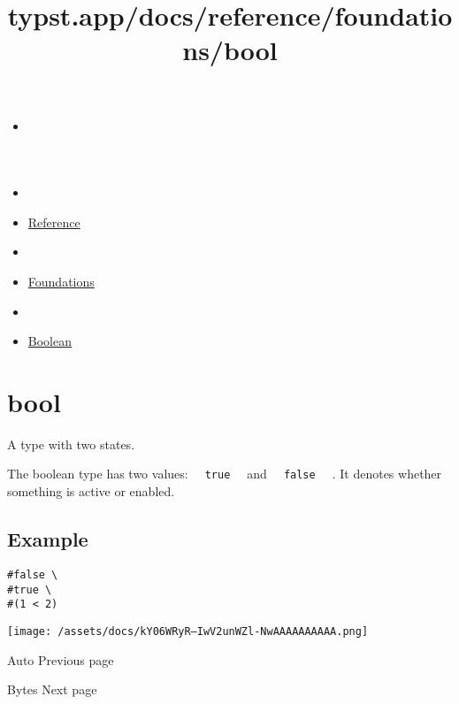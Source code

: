 \title{typst.app/docs/reference/foundations/bool}

\begin{itemize}
\tightlist
\item
  \href{/docs}{}
\item
  
\item
  \href{/docs/reference/}{Reference}
\item
  
\item
  \href{/docs/reference/foundations/}{Foundations}
\item
  
\item
  \href{/docs/reference/foundations/bool/}{Boolean}
\end{itemize}

\section{\texorpdfstring{{ bool }}{ bool }}\label{summary}

A type with two states.

The boolean type has two values:
\texttt{\ }{\texttt{\ true\ }}\texttt{\ } and
\texttt{\ }{\texttt{\ false\ }}\texttt{\ } . It denotes whether
something is active or enabled.

\subsection{Example}\label{example}

\begin{verbatim}
#false \
#true \
#(1 < 2)
\end{verbatim}

\texttt{[image: /assets/docs/kY06WRyR--IwV2unWZl-NwAAAAAAAAAA.png]}

\href{/docs/reference/foundations/auto/}{\pandocbounded{}}

{ Auto } { Previous page }

\href{/docs/reference/foundations/bytes/}{\pandocbounded{}}

{ Bytes } { Next page }

